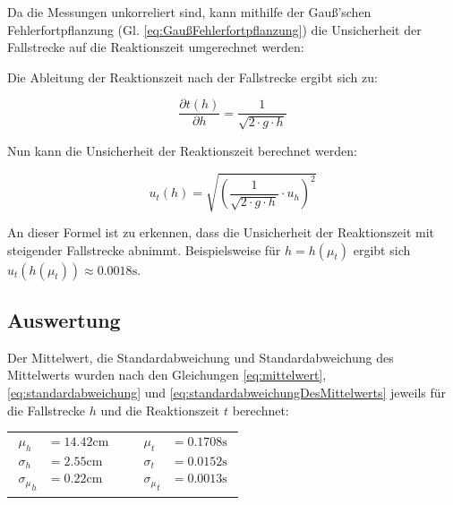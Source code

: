 \documentclass[a4paper,12pt]{article}
\begin{document}
Da die Messungen unkorreliert sind, kann mithilfe der Gauß'schen Fehlerfortpflanzung
(Gl. \ref{eq:GaußFehlerfortpflanzung}) die Unsicherheit der Fallstrecke auf die Reaktionszeit umgerechnet werden:

Die Ableitung der Reaktionszeit nach der Fallstrecke ergibt sich zu:

\begin{equation}
    \frac{\partial t(h)}{\partial h} = \frac{1}{\sqrt{2 \cdot g \cdot h}}
\end{equation}

Nun kann die Unsicherheit der Reaktionszeit berechnet werden:

\begin{equation}
    u_t(h) = \sqrt{\left(\frac{1}{\sqrt{2 \cdot g \cdot h}} \cdot u_h\right)^2}
\end{equation}

An dieser Formel ist zu erkennen, dass die Unsicherheit der Reaktionszeit mit steigender Fallstrecke abnimmt.
Beispielsweise für $h=h(\mu_t)$ ergibt sich $u_t(h(\mu_t)) \approx 0.0018\mathrm{s}$.


\subsection{Auswertung}

Der Mittelwert, die Standardabweichung und Standardabweichung des Mittelwerts wurden nach den
Gleichungen \ref{eq:mittelwert}, \ref{eq:standardabweichung} und \ref{eq:standardabweichungDesMittelwerts}
jeweils für die Fallstrecke $h$ und die Reaktionszeit $t$ berechnet:

\begin{table}[H]
    \centering
    \begin{tabular}{c c c}
        \parbox{4cm}{
            \begin{align*}
                \mu_h &= 14.42\mathrm{cm} \\
                \sigma_h &= 2.55\mathrm{cm} \\
                {\sigma_\mu}_h &= 0.22\mathrm{cm}
            \end{align*}
        } & \hspace{1cm} & \parbox{4cm}{
            \begin{align*}
                \mu_t &= 0.1708\mathrm{s} \\
                \sigma_t &= 0.0152\mathrm{s} \\
                {\sigma_\mu}_t &= 0.0013\mathrm{s}
            \end{align*}
        } \\
    \end{tabular}
\end{table}
\end{document}
